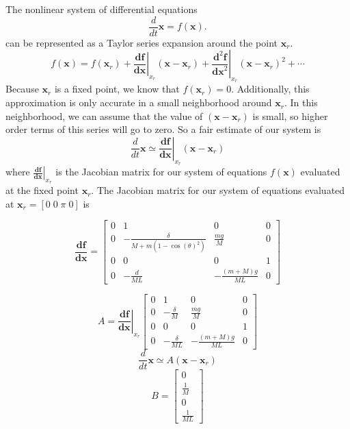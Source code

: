 \documentclass[]{article}
\newcommand{\bx}{\boldsymbol{x}}
\begin{document}
The nonlinear system of differential equations
\begin{equation}
		\frac{d}{dt} \bx = f(\bx).
\end{equation}
can be represented as a Taylor series expansion around the point $\bx_r$.
\begin{equation}
	 f(\bx) = f(\bx_r) +\left.  \frac{\boldsymbol{df}}{\boldsymbol{dx}} \right|_{x_r}(\bx -\bx_r) + \left. \frac{\boldsymbol{d}^2\boldsymbol{f}}{\boldsymbol{dx}^2} \right|_{x_r}(\bx -\bx_r)^2 + \cdots
\end{equation}
Because $\bx_r$ is a fixed point, we know that $f(\bx_r) = 0$. Additionally, this approximation is only accurate in a small neighborhood around $\bx_r$.  In this neighborhood, we can assume that the value of $(\bx -\bx_r)$ is small, so higher order terms of this series will go to zero. So a fair estimate of our system is
\begin{equation}
	\frac{d}{dt} \bx \simeq \left.  \frac{\boldsymbol{df}}{\boldsymbol{dx}} \right|_{x_r}(\bx -\bx_r) 
\end{equation}
where $\left.  \frac{\boldsymbol{df}}{\boldsymbol{dx}} \right|_{x_r}$ is the Jacobian matrix for our system of equations $f(\bx)$ evaluated at the fixed point $\bx_r$. The Jacobian matrix for our system of equations evaluated at $\bx_r = [0\; 0\; \pi \; 0]$ is 

	\begin{equation}
	 \frac{\boldsymbol{df}}{\boldsymbol{dx}}  = 
	\begin{bmatrix}
		0 & 1              & 0                          & 0 \\
		0 & -\frac{\delta}{M+m(1-\cos(\theta)^2)}      & \frac{mg}{M}                 & 0 \\
		0 & 0              & 0                          & 1 \\
		0 & -\frac{d}{ML} & -\frac{(m+M)g}{ML} & 0
	\end{bmatrix}
\end{equation}

	\begin{equation}
		A = \left.  \frac{\boldsymbol{df}}{\boldsymbol{dx}} \right|_{x_r}
	\begin{bmatrix}
		0 & 1              & 0                          & 0 \\
		0 & -\frac{\delta}{M}      & \frac{mg}{M}                 & 0 \\
		0 & 0              & 0                          & 1 \\
		0 & -\frac{\delta}{ML} & -\frac{(m+M)g}{ML} & 0
	\end{bmatrix}
\end{equation}
\begin{equation*}
	\frac{d}{dt} \bx \simeq A(\bx -\bx_r)
\end{equation*}
\begin{equation}
	B = 
	\begin{bmatrix}
		0 \\
		\frac{1}{M}  \\
		0  \\
		\frac{1}{ML}   
	\end{bmatrix}
\end{equation}
\end{document}
